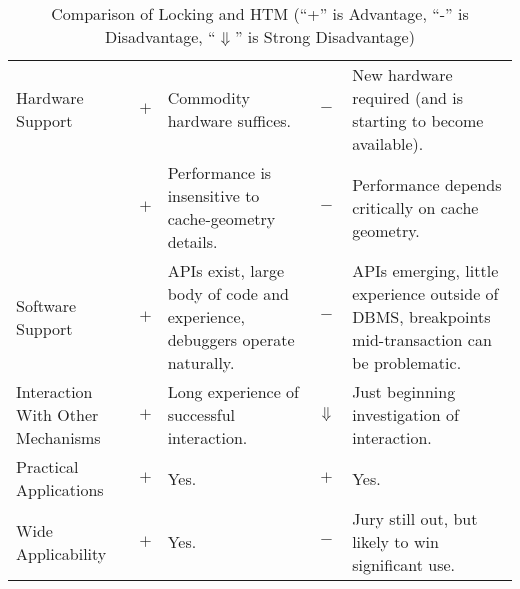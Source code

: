 \begin{table*}[p]
\begin{center}
\begin{tabular}{p{1.0in}||c|p{2.0in}||c|p{2.0in}}
\hline
Hardware Support
	& $+$
	& Commodity hardware suffices.
		& $-$
		& New hardware required (and is starting to become
		  available). \\
\cline{2-5}
	& $+$
	& Performance is insensitive to cache-geometry details.
		& $-$
		& Performance depends critically on cache geometry. \\
\hline
Software Support
	& $+$
	& APIs exist, large body of code and experience, debuggers operate
	  naturally.
		& $-$
		& APIs emerging, little experience outside of DBMS,
		  breakpoints mid-transaction can be problematic. \\
\hline
Interaction With Other Mechanisms
	& $+$
	& Long experience of successful interaction.
		& $\Downarrow$
		& Just beginning investigation of interaction. \\
\hline
Practical Applications
	& $+$
	& Yes.
		& $+$
		& Yes. \\
\hline
Wide Applicability
	& $+$
	& Yes.
		& $-$
		& Jury still out, but likely to win significant use. \\
\end{tabular}
\end{center}
\caption{Comparison of Locking and HTM (``+'' is Advantage, ``-'' is Disadvantage, ``$\Downarrow$'' is Strong Disadvantage)}
\label{tab:future:Comparison of Locking and HTM}
\end{table*}
